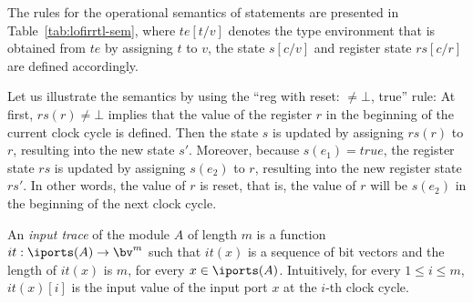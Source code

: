 The rules for the operational semantics of statements are presented in Table~\ref{tab:lofirrtl-sem}, where $te[t/v]$ denotes the type environment that is obtained from $te$ by assigning $t$ to $v$,
the state $s[c/v]$ and register state $rs[c/r]$ are defined accordingly.


Let us illustrate the semantics by using the ``reg with reset: $\neq \bot$, true'' rule: At first, $rs(r) \neq \bot$ implies that the value of the register $r$ in the beginning of the current clock cycle is defined. Then the state $s$ is updated by assigning $rs(r)$ to $r$, resulting into the new state $s'$. Moreover, because $s(e_1)=true$, the register state $rs$ is updated by assigning $s(e_2)$ to $r$, resulting into the new register state $rs'$. In other words, the value of $r$ is reset, that is, the value of $r$ will be $s(e_2)$ in the beginning of the next clock cycle.
%

An \emph{input trace} of the module $A$ of length $m$ is a function $it:\iports(A)\rightarrow\bv^m$ such that $it(x)$ is a sequence of bit vectors and the length of $it(x)$ is $m$, for every $x \in \iports(A)$.
Intuitively, for every $1\leq i\leq m$, $it(x)[i]$ is the input value of the input port $x$ at the $i$-th clock cycle.


